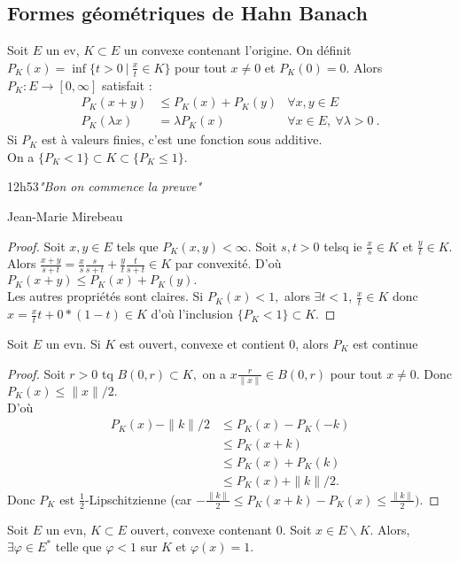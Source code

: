 \subsection{Formes géométriques de Hahn Banach}
\begin{propriete}
    Soit $E$ un ev, $K\subset E$ un convexe contenant l'origine. On définit $P_K(x)=\inf \{t>0\ |\ \frac{x}{t}\in K\} $ pour tout $x\neq 0$ et $P_K(0)=0.$ Alors $P_K:E\to [0,\infty ]$ satisfait :
    \begin{align*}
        P_K(x+y) &\le P_K(x)+P_K(y) &\forall x,y\in E\  \\
        P_K(\lambda x) &= \lambda P_K(x) &\forall x\in E,\  \forall \lambda>0\
    .\end{align*}
    Si $P_K$ est à valeurs finies, c'est une fonction sous additive. \\
    On a $\{P_K<1\} \subset K\subset \{P_K\le 1\} .$
\end{propriete}
\epigraph{12h53\itshape "Bon on commence la preuve"}{Jean-Marie Mirebeau}
\begin{proof}
    Soit $x,y\in E$ tels que $P_K(x,y)<\infty $. Soit $s,t>0$ telsq ie $\frac{x}{s}\in K$ et $\frac{y}{t}\in K.$ Alors $\frac{x+y}{s+t}=\frac{x}{s}\frac{s}{s+t}+\frac{y}{t}\frac{t}{s+t}\in K$ par convexité. D'où $P_K(x+y)\le P_K(x)+P_K(y).$\\
    Les autres propriétés sont claires. Si $P_K(x)<1,$ alors $\exists t<1$, $\frac{x}{t}\in K$ donc $x=\frac{x}{t}t+0*(1-t)\in K$ d'où l'inclusion $\{P_K<1\} \subset K.$
\end{proof}
\begin{lemme}
    Soit $E$ un evn. Si $K$ est ouvert, convexe et contient 0, alors $P_K$ est continue
\end{lemme}
\begin{proof}
    Soit $r>0$ tq $B(0,r)\subset K,$ on a $x\frac{r}{\|x\|}\in B(0,r)$ pour tout $x\neq 0.$ Donc $P_K(x)\le \|x\|/2.$ \\
    D'où 
    \begin{align*}
        P_K(x)-\|k\|/2&\le P_K(x)-P_K(-k)\\
        &\le P_K(x+k)\\
        &\le P_K(x)+P_K(k)\\
        &\le P_K(x)+\|k\|/2.
    \end{align*}
    Donc $P_K$ est $\frac{1}{2}$-Lipschitzienne (car $-\frac{\|k\|}{2}\le P_K(x+k)-P_K(x)\le \frac{\|k\|}{2}).$
\end{proof}
\begin{theoreme}
    Soit $E$ un evn, $K\subset E$ ouvert, convexe contenant  0. Soit $x\in E \backslash K.$ Alors, $\exists \varphi \in E^*$ telle que $\varphi <1$ sur $K$ et $\varphi (x)=1.$
\end{theoreme}
